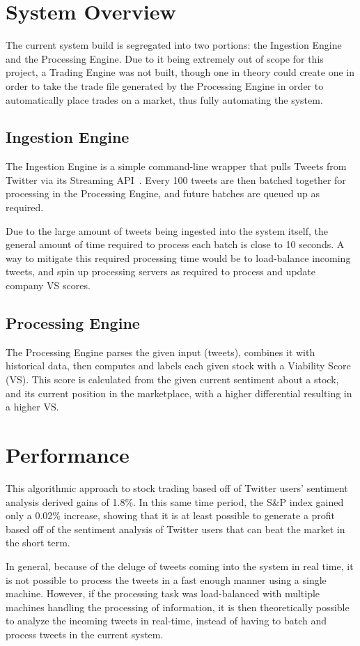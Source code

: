 \documentclass[11pt]{article}
\begin{document}
\section{System Overview}
The current system build is segregated
into two portions: the Ingestion Engine
and the Processing Engine. Due to it being
extremely out of scope for this project,
a Trading Engine was not built, though
one in theory could create one in order
to take the trade file generated by the
Processing Engine in order to automatically
place trades on a market, thus fully
automating the system.

\subsection{Ingestion Engine}
The Ingestion Engine is a simple
command-line wrapper that pulls Tweets
from Twitter via its Streaming API~\cite{streaming}.
Every 100 tweets are then batched together
for processing in the Processing Engine,
and future batches are queued up as required.

Due to the large amount of tweets being
ingested into the system itself, the general
amount of time required to process each batch
is close to 10 seconds. A way to mitigate this
required processing time would be to load-balance
incoming tweets, and spin up processing servers
as required to process and update company VS scores.

\subsection{Processing Engine}
The Processing Engine parses the given input
(tweets), combines it with historical data,
then computes and labels each given stock with
a Viability Score (VS). This score is calculated
from the given current sentiment about a stock,
and its current position in the marketplace, with
a higher differential resulting in a higher VS.

\section{Performance}
This algorithmic approach to stock trading
based off of Twitter users' sentiment analysis
derived gains of 1.8\%. In this same time
period, the S\&P index gained only a 0.02\%
increase, showing that it is at least possible
to generate a profit based off of the sentiment
analysis of Twitter users that can beat the
market in the short term.

In general, because of the deluge of tweets
coming into the system in real time, it is
not possible to process the tweets in a fast
enough manner using a single machine. However,
if the processing task was load-balanced with
multiple machines handling the processing of
information, it is then theoretically possible
to analyze the incoming tweets in real-time,
instead of having to batch and process tweets
in the current system.
\end{document}
